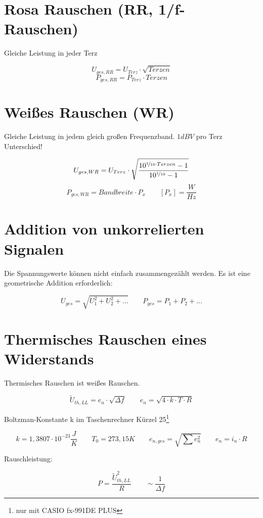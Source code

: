 \documentclass[a4paper, 12pt]{report}
\begin{document}
	
	\clearpage
	
	
	
\section*{Rosa Rauschen (RR, 1/f-Rauschen)}
	
	Gleiche Leistung in jeder Terz
	
	\[ U_{ges,RR} = U_{Terz} \cdot \sqrt{Terzen} \]
	\[ P_{ges,RR} = P_{Terz} \cdot Terzen \]
		

\section*{Weißes Rauschen (WR)}
	
	Gleiche Leistung in jedem gleich großen Frequenzband. $ 1 dBV $ pro Terz Unterschied!
	
	\[ U_{ges,WR} = U_{Terz} \cdot \sqrt{\frac{10^{\nicefrac{1}{10} \cdot Terzen} - 1}{10^{\nicefrac{1}{10}} - 1}} \]
	\[ P_{ges,WR} = Bandbreite \cdot P_x \qquad [P_x] = \frac{W}{Hz} \]


\section*{Addition von unkorrelierten Signalen}

	Die Spannungswerte können nicht einfach zusammengezählt werden. Es ist eine geometrische Addition erforderlich:
	
	{\large \[
		U_{ges} = \sqrt{U^2_{1} + U^2_{2} + ...} \qquad
		P_{ges} = P_{1} + P_{2} + ...
	\]}

	
\section*{Thermisches Rauschen eines Widerstands}

	Thermisches Rauschen ist weißes Rauschen.

	{\large 	\[ \tilde{U}_{th,LL} = e_n  \cdot  \sqrt{\Delta f} \qquad e_n = \sqrt{4 \cdot k \cdot T \cdot R} \]}
	
	Boltzman-Konstante k im Taschenrechner Kürzel 25\footnote{nur mit CASIO fx-991DE PLUS}
	
	\[ k = 1,3807 \cdot 10^{-23} \frac{J}{K} \qquad T_0 = 273,15 K
	\qquad e_{n,ges} = \sqrt{\sum e^2_n}
	\qquad e_n = i_n \cdot R
	\]
	
	Rauschleistung:
	
	{\large \[ P = \frac{\tilde{U}^2_{th,LL}}{R} \qquad \sim \frac{1}{\Delta f} \]}
\end{document}
